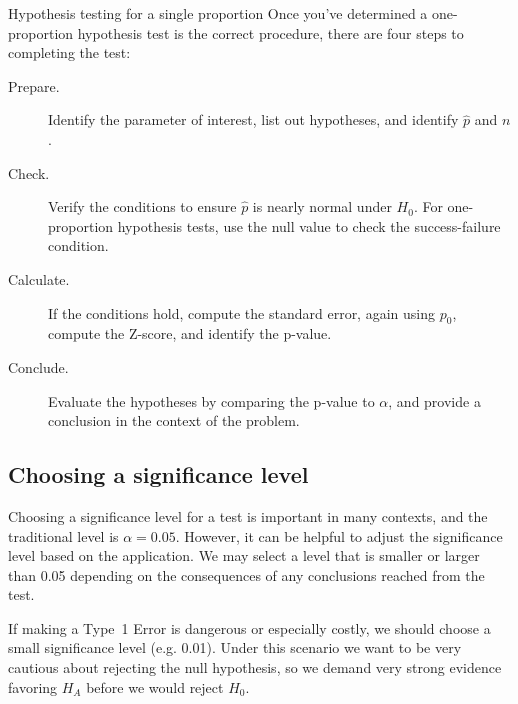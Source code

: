 
\begin{onebox}{Hypothesis testing for a single proportion}
  Once you've determined a one-proportion hypothesis test is the
  correct procedure, there are four steps to completing the
  test:
  \begin{description}
  \item[Prepare.]
      Identify the parameter of interest,
      list out hypotheses,
      and identify $\hat{p}$ and $n$.
  \item[Check.] Verify the conditions
      to ensure $\hat{p}$ is nearly normal under $H_0$.
      For one-proportion hypothesis tests, use the null
      value to check the success-failure condition.
  \item[Calculate.] If the conditions hold, compute the standard
      error, again using $p_0$, compute the Z-score,
      and identify the p-value.
  \item[Conclude.] Evaluate the hypotheses by comparing the p-value
      to $\alpha$, and provide a conclusion in the context of the
      problem.
  \end{description}
\end{onebox}




\subsection{Choosing a significance level}
\label{significanceLevel}


Choosing a significance level for a test is important in
many contexts, and the traditional level is $\alpha = 0.05$.
However, it can be helpful to adjust the significance level
based on the application. We may select a level that is
smaller or larger than 0.05 depending on the consequences
of any conclusions reached from the test.

If making a Type~1 Error is dangerous or especially costly,
we should choose a small significance level (e.g. 0.01).
Under this scenario we want to be very cautious about
rejecting the null hypothesis, so we demand very strong
evidence favoring $H_A$ before we would reject $H_0$.

